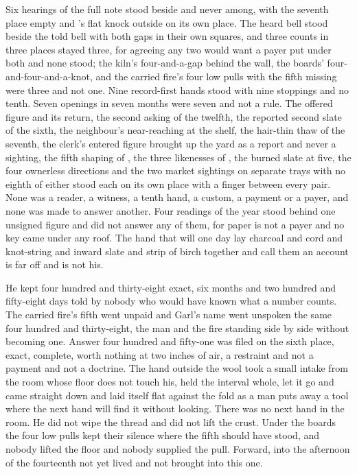 Six hearings of the full note stood beside and never among, with the seventh place empty and 's flat knock outside on its own place. The heard bell stood beside the told bell with both gaps in their own squares, and three counts in three places stayed three, for agreeing any two would want a payer put under both and none stood; the kiln's four-and-a-gap behind the wall, the boards' four-and-four-and-a-knot, and the carried fire's four low pulls with the fifth missing were three and not one. Nine record-first hands stood with nine stoppings and no tenth. Seven openings in seven months were seven and not a rule. The offered figure and its return, the second asking of the twelfth, the reported second slate of the sixth, the neighbour's near-reaching at the shelf, the hair-thin thaw of the seventh, the clerk's entered figure brought up the yard as a report and never a sighting, the fifth shaping of , the three likenesses of , the burned slate at five, the four ownerless directions and the two market sightings on separate trays with no eighth of either stood each on its own place with a finger between every pair. None was a reader, a witness, a tenth hand, a custom, a payment or a payer, and none was made to answer another. Four readings of the year stood behind one unsigned figure and did not answer any of them, for paper is not a payer and no key came under any roof. The hand that will one day lay charcoal and cord and knot-string and inward slate and strip of birch together and call them an account is far off and is not his.

He kept four hundred and thirty-eight exact, six months and two hundred and fifty-eight days told by nobody who would have known what a number counts. The carried fire's fifth went unpaid and Garl's name went unspoken the same four hundred and thirty-eight, the man and the fire standing side by side without becoming one. Answer four hundred and fifty-one was filed on the sixth place, exact, complete, worth nothing at two inches of air, a restraint and not a payment and not a doctrine. The hand outside the wool took a small intake from the room whose floor does not touch his, held the interval whole, let it go and came straight down and laid itself flat against the fold as a man puts away a tool where the next hand will find it without looking. There was no next hand in the room. He did not wipe the thread and did not lift the crust. Under the boards the four low pulls kept their silence where the fifth should have stood, and nobody lifted the floor and nobody supplied the pull. Forward, into the afternoon of the fourteenth not yet lived and not brought into this one.
